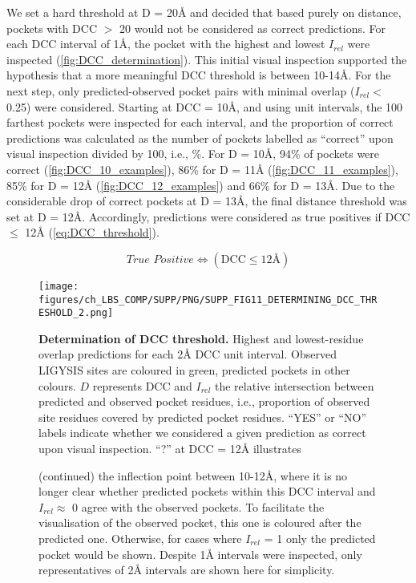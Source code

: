 We set a hard threshold at D = 20\AA{} and decided that based purely on distance, pockets with DCC $>$ 20 would not be considered as correct predictions. For each DCC interval of 1\AA{}, the pocket with the highest and lowest $I_{rel}$ were inspected (\autoref{fig:DCC_determination}). This initial visual inspection supported the hypothesis that a more meaningful DCC threshold is between 10-14\AA{}. For the next step, only predicted-observed pocket pairs with minimal overlap ($I_{rel} <$ 0.25) were considered. Starting at DCC = 10\AA{}, and using unit intervals, the 100 farthest pockets were inspected for each interval, and the proportion of correct predictions was calculated as the number of pockets labelled as ``correct'' upon visual inspection divided by 100, i.e., \%. For D = 10\AA{}, 94\% of pockets were correct (\autoref{fig:DCC_10_examples}), 86\% for D = 11\AA{} (\autoref{fig:DCC_11_examples}), 85\% for D = 12\AA{} (\autoref{fig:DCC_12_examples}) and 66\% for D = 13\AA{}. Due to the considerable drop of correct pockets at D = 13\AA{}, the final distance threshold was set at D = 12\AA{}. Accordingly, predictions were considered as true positives if DCC $\leq$ 12\AA{} (\autoref{eq:DCC_threshold}).

\begin{equation}
\textit{True Positive} \iff (\text{DCC} \leq 12\text{\AA{}})
\label{eq:DCC_threshold}
\end{equation}

\begin{figure}
    \centering
    \texttt{[image: figures/ch\_LBS\_COMP/SUPP/PNG/SUPP\_FIG11\_DETERMINING\_DCC\_THRESHOLD\_2.png]}
    
    \caption[Determination of DCC threshold]{\textbf{Determination of DCC threshold.} Highest and lowest-residue overlap predictions for each 2\AA{} DCC unit interval. Observed LIGYSIS sites are coloured in green, predicted pockets in other colours. $D$ represents DCC and $I_{rel}$ the relative intersection between predicted and observed pocket residues, i.e., proportion of observed site residues covered by predicted pocket residues. ``YES'' or ``NO'' labels indicate whether we considered a given prediction as correct upon visual inspection. ``?'' at DCC = 12\AA{} illustrates    }
    \label{fig:DCC_determination}
\end{figure}

\begin{figure}[ht]
\ContinuedFloat
\caption*{(continued) the inflection point between 10-12\AA{}, where it is no longer clear whether predicted pockets within this DCC interval and $I_{rel} \approx$ 0 agree with the observed pockets. To facilitate the visualisation of the observed pocket, this one is coloured after the predicted one. Otherwise, for cases where $I_{rel}$ = 1 only the predicted pocket would be shown. Despite 1\AA{} intervals were inspected, only representatives of 2\AA{} intervals are shown here for simplicity.}
\end{figure}
\FloatBarrier

